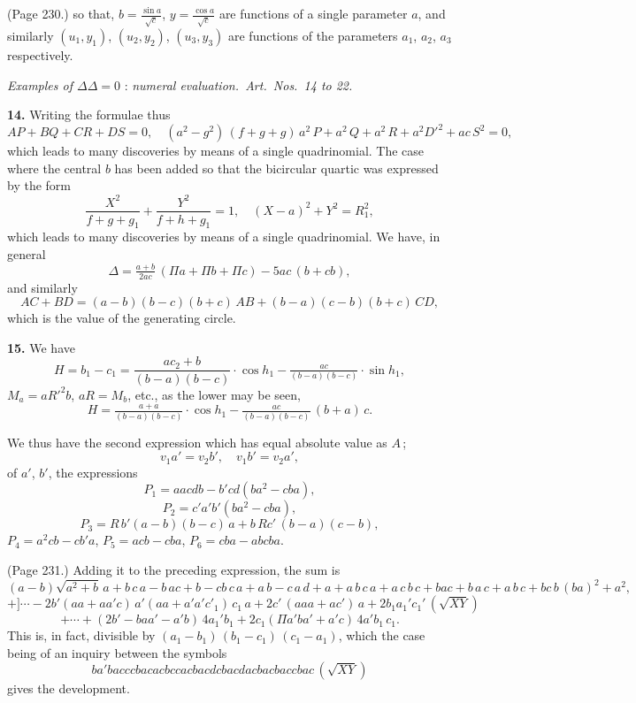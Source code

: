 \documentclass[11pt,a4paper]{book}
\begin{document}
\medskip

\noindent (Page 230.) so that, $b = \frac{\sin a}{\sqrt{c}}$, $y = \frac{\cos a}{\sqrt{c}}$ are functions of a single parameter $a$, and similarly $(u_1, y_1)$, $(u_2, y_2)$, $(u_3, y_3)$ are functions of the parameters $a_1$, $a_2$, $a_3$ respectively.

\bigskip

\noindent\textit{Examples of $\Delta\Delta=0$ }: \textit{numeral evaluation.\ Art.\ Nos.\ 14 to 22.}

\medskip

\noindent\textbf{14.} Writing the formulae thus
\[
A P + B Q + C R + D S = 0, \quad (a^2 - g^2)\,(f + g + g)\,a^2\,P + a^2\,Q + a^2\,R + a^2 D'^2 + a c\,S^2 = 0,
\]
which leads to many discoveries by means of a single quadrinomial. The case where the central $b$ has been added so that the bicircular quartic was expressed by the form
\[
\frac{X^2}{f + g + g_1} + \frac{Y^2}{f + h + g_1} = 1, \quad (X - a)^2 + Y^2 = R_1^2,
\]
which leads to many discoveries by means of a single quadrinomial. We have, in general
\[
\Delta = \tfrac{a + b}{2 a c}\,(\Pi a + \Pi b + \Pi c) - 5 a c\,(b + c b),
\]
and similarly
\[
A C + B D = (a - b)(b - c)(b + c)\,A B + (b - a)(c - b)(b + c)\,C D,
\]
which is the value of the generating circle.

\medskip

\noindent\textbf{15.} We have
\[
H = b_1 - c_1 = \frac{a c_2 + b}{(b - a)(b - c)}\cdot \cos h_1 - \tfrac{a c}{(b - a)(b - c)}\cdot \sin h_1,
\]
$M_a = a R'^2 b$, $a R = M_b$, etc., as the lower may be seen,
\[
H = \tfrac{a + a}{(b - a)(b - c)}\cdot \cos h_1 - \tfrac{a c}{(b - a)(b - c)}\,(b + a)\,c.
\]

We thus have the second expression which has equal absolute value as $A$\,;
\[
v_1 a' = v_2 b', \quad v_1 b' = v_2 a',
\]
of $a'$, $b'$, the expressions
\[
P_1 = a a c d b - b' c d (b a^2 - c b a),
\]
\[
P_2 = c' a' b' (b a^2 - c b a),
\]
\[
P_3 = R\,b' (a - b)(b - c)\,a + b\,R c'\,(b - a)(c - b),
\]
$P_4 = a^2 c b - c b' a$,
$P_5 = a c b - c b a$,
$P_6 = c b a - a b c b a$.

\medskip

\noindent (Page 231.) Adding it to the preceding expression, the sum is
\[
( a - b)\sqrt{a^2 + b}\,a + b\,c\,a - b\,a c + b - c b\,c\,a + a\,b - c\,a\,d + a + a\,b\,c\,a + a\,c\,b\,c + b a c + b\,a\,c + a\,b\,c + b c\,b\,(b a)^2 + a^2,
\]
\[
+ ]\cdots - 2 b' (a a + a a' c)\,a' (a a + a' a' c'_1)\,c_1\,a + 2 c'\,(a a a + a c')\,a + 2 b_1 a_1' c_1'\,(\sqrt{X Y})
\]
\[
+ \cdots + (2 b' - b a a' - a' b)\,4 a_1' b_1 + 2 c_1 (\Pi a' b a' + a' c)\,4 a' b_1\,c_1.
\]
This is, in fact, divisible by $(a_1 - b_1)\,(b_1 - c_1)\,(c_1 - a_1)$, which the case being of an inquiry between the symbols
\[
b a' b a c c c b a c a c b c c a c b a c d c b a c d a c b a c b a c c b a c\,(\sqrt{X Y})
\]
gives the development.
\end{document}
